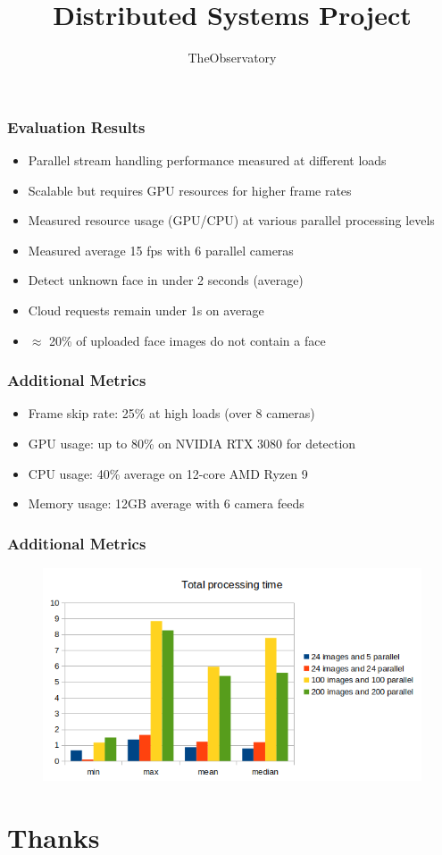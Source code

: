 \documentclass[11pt,t,usepdftitle=false,aspectratio=169]{beamer}
\begin{document}
\begin{frame}
	\frametitle{Evaluation Results}
	\begin{itemize}
		\item Parallel stream handling performance measured at different loads
		\item Scalable but requires GPU resources for higher frame rates
		\item Measured resource usage (GPU/CPU) at various parallel processing levels
		\item Measured average 15 fps with 6 parallel cameras
		\item Detect unknown face in under 2 seconds (average)
		\item Cloud requests remain under 1s on average
		\item $\approx$ 20\% of uploaded face images do not contain a face
	\end{itemize}
\end{frame}

\begin{frame}
\frametitle{Additional Metrics}
\begin{itemize}
	\item Frame skip rate: 25\% at high loads (over 8 cameras)
	\item GPU usage: up to 80\% on NVIDIA RTX 3080 for detection
	\item CPU usage: 40\% average on 12-core AMD Ryzen 9
	\item Memory usage: 12GB average with 6 camera feeds
\end{itemize}
\end{frame}
\begin{frame}
	\frametitle{Additional Metrics}
	\begin{figure}
		\centering
		\includegraphics[width=0.80\linewidth]{_images/total_processing_time.png}
	\end{figure}
\end{frame}
\title[TheObservatory]{Distributed Systems Project}
\subtitle{TheObservatory}
\section{Thanks}
\end{document}
